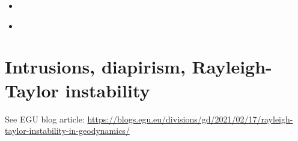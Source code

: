 \begin{scriptsize}
\begin{itemize}
\item[\twothousandeight] 
\textcite{kore08} 
\item[\twothousandtwelve] 
\textcite{nata12} 
\end{itemize}
\end{scriptsize}

\section{Intrusions, diapirism, Rayleigh-Taylor instability}

See EGU blog article: 
\url{https://blogs.egu.eu/divisions/gd/2021/02/17/rayleigh-taylor-instability-in-geodynamics/}

